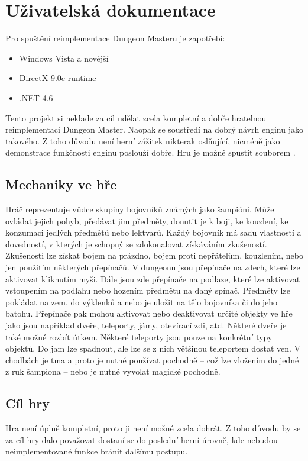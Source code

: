 \chapter{Uživatelská dokumentace}
Pro spuštění reimplementace Dungeon Masteru je zapotřebí:
\begin{itemize}
\item Windows Vista a novější 
\item DirectX 9.0c runtime  
\item .NET 4.6
\end{itemize}

Tento projekt si neklade za cíl udělat zcela kompletní a dobře hratelnou reimplementaci Dungeon Master.
Naopak se soustředí na dobrý návrh enginu jako takového. Z toho důvodu není herní zážitek nikterak
oslňující, nicméně jako demonstrace funkčnosti enginu poslouží dobře.
Hru je možné spustit souborem .

\section{Mechaniky ve hře}
Hráč reprezentuje vůdce skupiny bojovníků známých jako šampióni. Může ovládat jejich pohyb, 
předávat jim předměty, donutit je k boji, ke kouzlení, ke konzumaci jedlých předmětů nebo lektvarů.
Každý bojovník má sadu vlastností a dovedností, v kterých je schopný se zdokonalovat získáváním zkušeností.
Zkušenosti lze získat bojem na prázdno, bojem proti nepřátelům, kouzlením, nebo jen použitím některých přepínačů.
V dungeonu jsou přepínače na zdech, které lze aktivovat kliknutím myši. Dále jsou zde přepínače na 
podlaze, které lze aktivovat vstoupením na podlahu nebo hozením předmětu na daný spínač. Předměty lze
pokládat na zem, do výklenků a nebo je uložit na tělo bojovníka či do jeho batohu. Přepínače pak mohou 
aktivovat nebo deaktivovat určité objekty ve hře jako jsou například dveře, teleporty, jámy, otevírací
zdi, atd. Některé dveře je také možné rozbít útkem. Některé teleporty jsou pouze na konkrétní typy objektů.
Do jam lze spadnout, ale lze se z nich většinou teleportem dostat ven. V chodbách je tma a proto je nutné 
používat pochodně -- což lze vložením do jedné z ruk šampiona -- nebo je nutné vyvolat magické pochodně.


\section{Cíl hry}
Hra není úplně kompletní, proto ji není možné zcela dohrát. Z toho důvodu by se za cíl 
hry dalo považovat dostaní se do poslední herní úrovně, kde nebudou neimplementované funkce
bránit dalšímu postupu.

